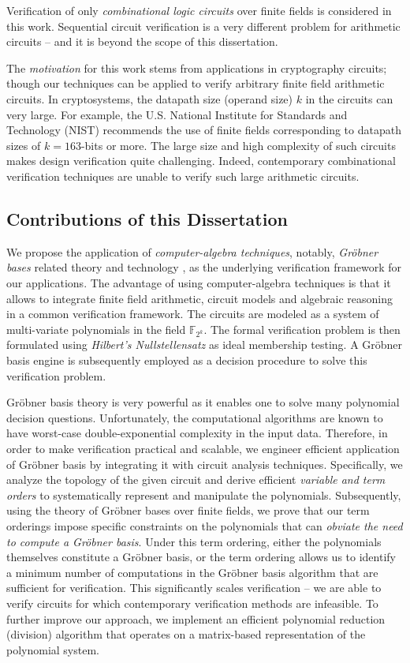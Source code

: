 Verification of only {\it combinational logic circuits} over finite
fields is considered in this work. Sequential circuit verification is
a very different problem for arithmetic circuits -- and it is beyond
the scope of this dissertation. 



The {\it motivation} for this work stems from applications
in cryptography circuits; though our techniques can be applied to
verify arbitrary finite field arithmetic circuits. In cryptosystems,
the datapath size (operand size) $k$ in the circuits can very
large. For example, the U.S. National Institute for Standards and
Technology (NIST) recommends the use of finite fields corresponding to datapath
sizes of $k = 163$-bits or more. The large size and high complexity of
such circuits  makes design verification quite challenging. Indeed,
contemporary combinational verification techniques are unable to
verify such large arithmetic circuits.  


\subsection{Contributions of this Dissertation}
We propose the application of {\it computer-algebra techniques},
notably, {\it Gr\"obner bases} related theory and technology
\cite{buchberger_thesis} \cite{gb_book}, as the underlying
verification framework for our applications. The advantage of using
computer-algebra techniques is that it allows to integrate finite
field arithmetic, circuit models and algebraic reasoning in a common
verification framework. The circuits are modeled as a system of
multi-variate polynomials in the field $\mathbb{F}_{2^k}$.  The formal
verification problem is then formulated using {\it Hilbert's
  Nullstellensatz} \cite{ideals:book} as ideal membership testing. A
Gr\"obner basis engine is subsequently employed as a decision
procedure to solve this verification problem. 


Gr\"obner basis theory is very powerful as it enables one to 
solve many polynomial decision questions. Unfortunately, the
computational algorithms are known to have worst-case
double-exponential complexity in the input data.  Therefore, in order
to make verification practical and scalable,  we engineer efficient
application of Gr\"obner basis by integrating it with circuit analysis
techniques.  Specifically, we analyze the topology of the given
circuit and derive efficient {\it variable and term orders} to
systematically represent and manipulate the polynomials. Subsequently,
using the theory of Gr\"obner bases over finite fields, we prove that
our term orderings impose specific constraints on the polynomials that
can {\it obviate the need to compute a Gr\"obner basis}. Under this
term ordering, either the polynomials themselves constitute a
Gr\"obner basis, or the term ordering allows us to identify a minimum
number of computations in the Gr\"obner basis algorithm that are
sufficient for verification. This significantly scales verification --
we are able to verify circuits for which contemporary verification
methods are infeasible. To further improve our approach, we implement
an efficient polynomial reduction (division) algorithm that operates
on a matrix-based representation of the polynomial system. 

